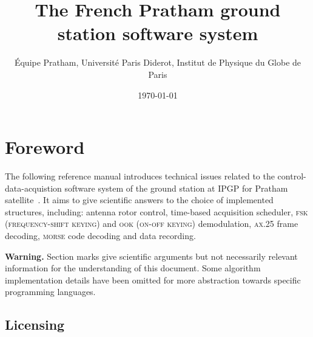 \documentclass[a4paper]{report}
\begin{document}
\title{The French Pratham ground station software system}

\author{\'Equipe Pratham, Universit\'e Paris Diderot, Institut de Physique du Globe de Paris}
\date{\today}

\maketitle

\tableofcontents




\chapter{Foreword}
\label{sec:foreword}

The following reference manual introduces technical issues related to the control-data-acquistion software system of the ground station at IPGP for Pratham satellite~\cite{IITB_general}. It aims to give scientific answers to the choice of implemented structures, including: antenna rotor control, time-based acquisition scheduler, \textsc{fsk} (\textsc{frequency-shift keying}) and \textsc{ook} (\textsc{on-off keying}) demodulation, \textsc{ax.25} frame decoding, \textsc{morse} code decoding and data recording.

\textbf{Warning.} Section marks { \color{rltred}{\Radioactivity} } give scientific arguments but not necessarily relevant information for the understanding of this document. Some algorithm implementation details have been omitted for more abstraction towards specific programming languages.

\section{Licensing}
\end{document}
